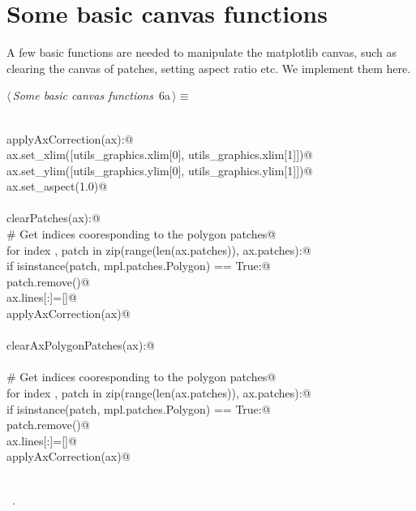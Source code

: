 \documentclass[11.5pt]{report}
\begin{document}
\section{Some basic canvas functions}

A few basic functions are needed to manipulate the matplotlib canvas, such as clearing the canvas of patches, setting aspect ratio etc. We implement them here. 

\begin{flushleft} \small
\begin{minipage}{\linewidth}\label{scrap4}\raggedright\small
{} $\langle\,${\itshape Some basic canvas functions}\nobreak\ {\footnotesize {6a}}$\,\rangle\equiv$
\vspace{-1ex}
\begin{list}{}{} \item
\mbox{}\verb@@\\
\mbox{}\verb@def applyAxCorrection(ax):@\\
\mbox{}\verb@      ax.set_xlim([utils_graphics.xlim[0], utils_graphics.xlim[1]])@\\
\mbox{}\verb@      ax.set_ylim([utils_graphics.ylim[0], utils_graphics.ylim[1]])@\\
\mbox{}\verb@      ax.set_aspect(1.0)@\\
\mbox{}\verb@@\\
\mbox{}\verb@def clearPatches(ax):@\\
\mbox{}\verb@    # Get indices cooresponding to the polygon patches@\\
\mbox{}\verb@    for index , patch in zip(range(len(ax.patches)), ax.patches):@\\
\mbox{}\verb@        if isinstance(patch, mpl.patches.Polygon) == True:@\\
\mbox{}\verb@            patch.remove()@\\
\mbox{}\verb@    ax.lines[:]=[]@\\
\mbox{}\verb@    applyAxCorrection(ax)@\\
\mbox{}\verb@@\\
\mbox{}\verb@def clearAxPolygonPatches(ax):@\\
\mbox{}\verb@@\\
\mbox{}\verb@    # Get indices cooresponding to the polygon patches@\\
\mbox{}\verb@    for index , patch in zip(range(len(ax.patches)), ax.patches):@\\
\mbox{}\verb@        if isinstance(patch, mpl.patches.Polygon) == True:@\\
\mbox{}\verb@            patch.remove()@\\
\mbox{}\verb@    ax.lines[:]=[]@\\
\mbox{}\verb@    applyAxCorrection(ax)@\\
\mbox{}\verb@@\\
\mbox{}\verb@@{\NWsep}
\end{list}
\vspace{-1.5ex}
\footnotesize
\begin{list}{}{\setlength{\itemsep}{-\parsep}\setlength{\itemindent}{-\leftmargin}}
\item \NWtxtMacroRefIn\ .


\end{list}
\end{minipage}
\end{flushleft}
\end{document}
